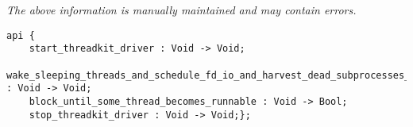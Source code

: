 \label{api:Threadkit\_Driver\_For\_Os}

{\tiny \it The above information is manually maintained and may contain errors.}
\begin{verbatim}
api {
    start_threadkit_driver : Void -> Void;
    wake_sleeping_threads_and_schedule_fd_io_and_harvest_dead_subprocesses__iu : Void -> Void;
    block_until_some_thread_becomes_runnable : Void -> Bool;
    stop_threadkit_driver : Void -> Void;};
\end{verbatim}
